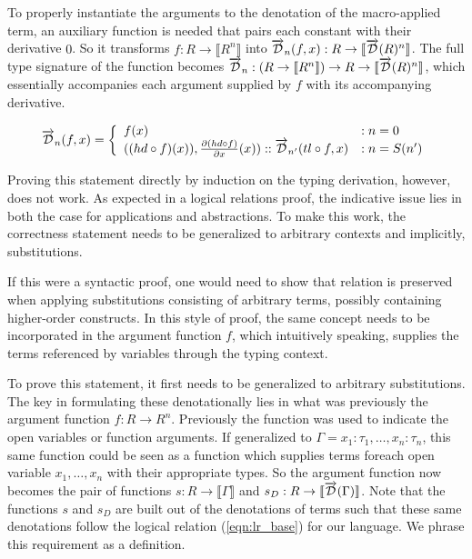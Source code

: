   To properly instantiate the arguments to the denotation of the macro-applied term, an auxiliary function is needed that pairs each constant with their derivative $0$. So it transforms $f : R \rightarrow \llbracket R^n \rrbracket$ into $\overrightarrow{\mathcal{D}}_n(f, x) : R \rightarrow \llbracket \overrightarrow{\mathcal{D}}(R)^n \rrbracket$.
  The full type signature of the function becomes $\overrightarrow{\mathcal{D}}_n : (R \rightarrow \llbracket R^n \rrbracket) \rightarrow R \rightarrow \llbracket \overrightarrow{\mathcal{D}}(R)^n \rrbracket$, which essentially accompanies each argument supplied by $f$ with its accompanying derivative.

  \begin{equation}
    \overrightarrow{\mathcal{D}}_n(f, x) =
      \left\{
        \begin{array}{ll}
          f(x) & : n = 0 \\
          ((hd \circ f)(x)), \frac{\partial{(hd \circ f)}}{\partial{x}}(x)) :: \overrightarrow{\mathcal{D}}_{n'}(tl \circ f, x) & : n = S(n') \\
        \end{array}
      \right.
  \label{eqn:argument_df}
  \end{equation}

  Proving this statement directly by induction on the typing derivation, however, does not work.
  As expected in a logical relations proof, the indicative issue lies in both the case for applications and abstractions.
  To make this work, the correctness statement needs to be generalized to arbitrary contexts and implicitly, substitutions.

  If this were a syntactic proof, one would need to show that relation is preserved when applying substitutions consisting of arbitrary terms, possibly containing higher-order constructs.
  In this style of proof, the same concept needs to be incorporated in the argument function $f$, which intuitively speaking, supplies the terms referenced by variables through the typing context.


  To prove this statement, it first needs to be generalized to arbitrary substitutions.
  The key in formulating these denotationally lies in what was previously the argument function $f : R \rightarrow R^n$.
  Previously the function was used to indicate the open variables or function arguments.
  If generalized to $\Gamma = x_1 : \tau_1, \dots, x_n : \tau_n$, this same function could be seen as a function which supplies terms foreach open variable $x_1, \dots, x_n$ with their appropriate types.
  So the argument function now becomes the pair of functions $s : R \rightarrow \llbracket \Gamma \rrbracket$ and $s_D : R \rightarrow \llbracket \overrightarrow{\mathcal{D}}(\Gamma) \rrbracket$.
  Note that the functions $s$ and $s_D$ are built out of the denotations of terms such that these same denotations follow the logical relation (\ref{eqn:lr_base}) for our language.
  We phrase this requirement as a definition.

